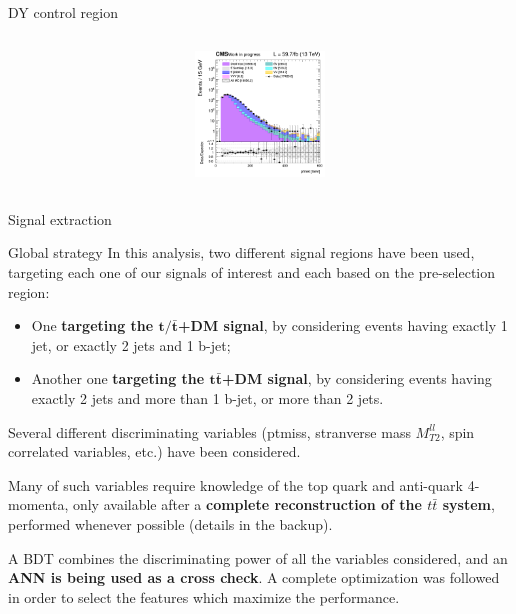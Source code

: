 \documentclass[8pt]{beamer}
\begin{document}
\begin{frame}{DY control region}
\begin{columns}
\begin{column}{0.33\textwidth}
\begin{center}
     			\includegraphics[width=1.0\textwidth, height=95pt]{figs/2018/log_cratio_dyCR_ll_METcorrected_pt.png}
    		\end{center}		
		\end{column}
\end{columns} \vfill

\end{frame}












\begin{frame}[standout]
Signal extraction
\end{frame}

\begin{frame}{Global strategy}
\justifying
In this analysis, \alert{two different signal regions} have been used, targeting each one of our signals of interest and each based on the pre-selection region:
\begin{itemize}
\item One \textbf{targeting the $\bm{t/\bar t}$+DM signal}, by considering events having exactly 1 jet, or exactly 2 jets and 1 b-jet;
\item Another one \textbf{targeting the $\bm{t \bar t}$+DM signal}, by considering events having exactly 2 jets and more than 1 b-jet, or more than 2 jets.
\end{itemize} \vfill

\alert{Several different discriminating variables} (ptmiss, stranverse mass $M_{T2}^{ll}$, spin correlated variables, etc.) have been considered. \vfill

Many of such variables require knowledge of the top quark and anti-quark 4-momenta, only available after a \textbf{complete reconstruction of the $t \bar t$ system}, performed whenever possible (details in the backup). \vfill

A \alert{BDT combines the discriminating power} of all the variables considered, and an \textbf{ANN is being used as a cross check}. A complete optimization was followed in order to select the features which maximize the performance. \vfill
\end{frame}
\end{document}
